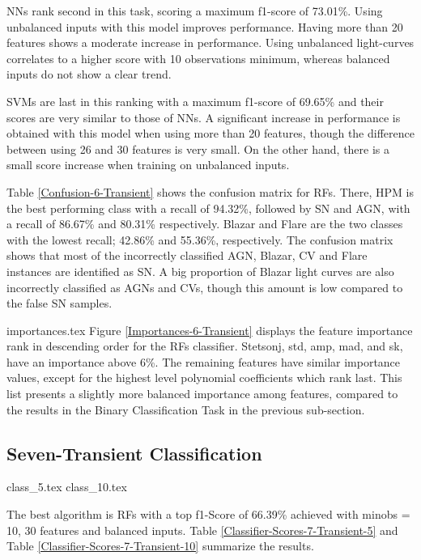 \documentclass[a4paper,fleqn,usenatbib]{mnras}
\begin{document}
NNs rank second in this task, scoring a maximum f1-score of 73.01\%. 
Using unbalanced inputs with this model improves performance.
Having more than 20 features shows a moderate increase in performance. 
Using unbalanced light-curves correlates to a higher score with 10 
observations minimum, whereas balanced inputs do
not show a clear trend.

SVMs are last in this ranking with a maximum f1-score of 69.65\% and their
scores are very similar to those of NNs. 
A significant increase in performance is obtained with this model when
using more than 20 features, though the difference between using 26
and 30 features is very small. 
On the other hand, there is a small score increase when training
on unbalanced inputs.

Table \ref{Confusion-6-Transient} shows the confusion matrix for RFs. 
There, HPM is the best performing class with a recall of 94.32\%, 
followed by SN and AGN, with a recall of 86.67\% and 80.31\%
respectively. 
Blazar and Flare are the two classes with the lowest recall; 42.86\%
and 55.36\%, respectively. 
The confusion matrix shows that most of the incorrectly
classified AGN, Blazar, CV and Flare instances are identified as
SN. A big proportion of Blazar light curves are also incorrectly
classified as AGNs and CVs, though this amount is low compared to the
false SN samples. 


{importances.tex} Figure
\ref{Importances-6-Transient} displays the feature importance rank in
descending order for the RFs classifier.
Stetson\textunderscore j, std, amp, mad, and sk, have an importance above 6\%. 
The remaining features have similar importance values, except
for the highest level polynomial coefficients which rank last.
This list presents a slightly more balanced importance among features,
compared to the results in the Binary Classification Task in the
previous sub-section.


\subsection{Seven-Transient Classification}

{class_5.tex}
{class_10.tex}

The best algorithm is RFs with a top f1-Score of 66.39\% achieved with 
min\textunderscore obs = 10, 30 features and balanced inputs.
Table \ref{Classifier-Scores-7-Transient-5} and Table
\ref{Classifier-Scores-7-Transient-10} summarize the results.
\end{document}
